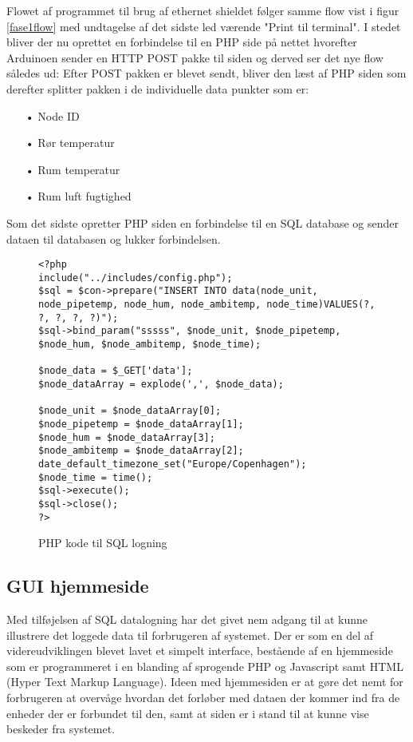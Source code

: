 Flowet af programmet til brug af ethernet shieldet følger samme flow vist i figur \ref{fase1flow}
med undtagelse af det sidste led værende "Print til terminal". I stedet bliver der nu oprettet en forbindelse til en PHP side på nettet hvorefter Arduinoen sender en HTTP POST pakke til siden og derved ser det nye flow således ud:
\newpage
{}
Efter POST pakken er blevet sendt, bliver den læst af PHP siden som derefter splitter pakken i de individuelle data punkter som er:
\begin{enumerate}
	\item[•]Node ID
	\item[•]Rør temperatur
	\item[•]Rum temperatur
	\item[•]Rum luft fugtighed
\end{enumerate}
Som det sidste opretter PHP siden en forbindelse til en SQL database og sender dataen til databasen og lukker forbindelsen.
\begin{figure}[!ht]
	\begin{lstlisting}
<?php
include("../includes/config.php");
$sql = $con->prepare("INSERT INTO data(node_unit, node_pipetemp, node_hum, node_ambitemp, node_time)VALUES(?, ?, ?, ?, ?)");
$sql->bind_param("sssss", $node_unit, $node_pipetemp, $node_hum, $node_ambitemp, $node_time);

$node_data = $_GET['data'];
$node_dataArray = explode(',', $node_data);

$node_unit = $node_dataArray[0];
$node_pipetemp = $node_dataArray[1];
$node_hum = $node_dataArray[3];
$node_ambitemp = $node_dataArray[2];
date_default_timezone_set("Europe/Copenhagen"); 
$node_time = time(); 
$sql->execute();
$sql->close();
?>
\end{lstlisting}
\caption{PHP kode til SQL logning}
\label{phpsql}
\end{figure}
\newpage
\subsection{GUI hjemmeside}
Med tilføjelsen af SQL datalogning har det givet nem adgang til at kunne illustrere det loggede data til forbrugeren af systemet.
Der er som en del af videreudviklingen blevet lavet et simpelt interface, bestående af en hjemmeside som er programmeret i en blanding af sprogende PHP og Javascript samt HTML (Hyper Text Markup Language).
\newline
Ideen med hjemmesiden er at gøre det nemt for forbrugeren at overvåge hvordan det forløber med dataen der kommer ind fra de enheder der er forbundet til den, samt at siden er i stand til at kunne vise beskeder fra systemet.

